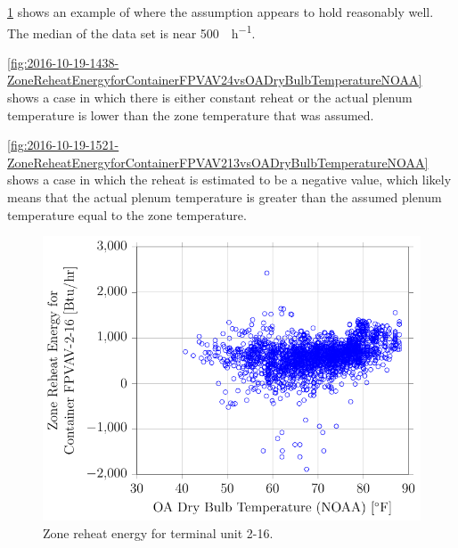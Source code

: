 \figref{}
\ref{fig:2016-10-19-1424-ZoneReheatEnergyforContainerFPVAV216vsOADryBulbTemperatureNOAA}
shows an example of where the assumption appears to hold reasonably well.  
The median of the data set is near \SI{500}{\btu\per\hour}. 

\figref{}
\ref{fig:2016-10-19-1438-ZoneReheatEnergyforContainerFPVAV24vsOADryBulbTemperatureNOAA}
shows a case in which there is either constant reheat or the actual
plenum temperature is lower than the zone temperature that was assumed.

\figref{}
\ref{fig:2016-10-19-1521-ZoneReheatEnergyforContainerFPVAV213vsOADryBulbTemperatureNOAA}
shows a case in which the reheat is estimated to be a negative value,
which likely means that the actual plenum temperature is greater than
the assumed plenum temperature equal to the zone temperature. 

\begin{figure}
\centering
\includegraphics[]{Plots/2016-10-19-1424-ZoneReheatEnergyforContainerFPVAV216vsOADryBulbTemperatureNOAA.pdf}
\caption{Zone reheat energy for terminal unit 2-16.}
\label{fig:2016-10-19-1424-ZoneReheatEnergyforContainerFPVAV216vsOADryBulbTemperatureNOAA}
\end{figure}

